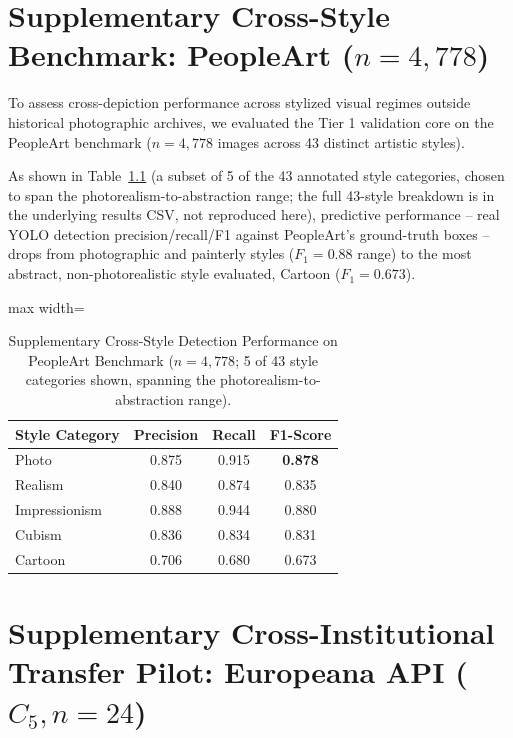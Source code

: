 \documentclass[12pt,a4paper]{report}
\begin{document}
\chapter{Supplementary Cross-Style Benchmark: PeopleArt ($n=4,778$)}
\label{app:peopleart}
To assess cross-depiction performance across stylized visual regimes outside historical photographic archives, we evaluated the Tier 1 validation core on the PeopleArt benchmark \cite{westlake2016} ($n=4,778$ images across 43 distinct artistic styles). 

As shown in Table~\ref{tab:peopleart_summary} (a subset of 5 of the 43 annotated style categories, chosen to span the photorealism-to-abstraction range; the full 43-style breakdown is in the underlying results CSV, not reproduced here), predictive performance -- real YOLO detection precision/recall/F1 against PeopleArt's ground-truth boxes -- drops from photographic and painterly styles ($F_1 = 0.88$ range) to the most abstract, non-photorealistic style evaluated, Cartoon ($F_1 = 0.673$).

\begin{table}[!htbp]
\centering
\caption{Supplementary Cross-Style Detection Performance on PeopleArt Benchmark ($n=4,778$; 5 of 43 style categories shown, spanning the photorealism-to-abstraction range).}
\label{tab:peopleart_summary}
\begin{adjustbox}{max width=\linewidth}
\begin{tabular}{lccc}
\toprule
\textbf{Style Category} & \textbf{Precision} & \textbf{Recall} & \textbf{F1-Score} \\
\midrule
Photo & 0.875 & 0.915 & \textbf{0.878} \\
Realism & 0.840 & 0.874 & 0.835 \\
Impressionism & 0.888 & 0.944 & 0.880 \\
Cubism & 0.836 & 0.834 & 0.831 \\
Cartoon & 0.706 & 0.680 & 0.673 \\
\bottomrule
\end{tabular}
\end{adjustbox}
\end{table}

\chapter{Supplementary Cross-Institutional Transfer Pilot: Europeana API ($C_5, n=24$)}
\label{app:europeana}
\end{document}
